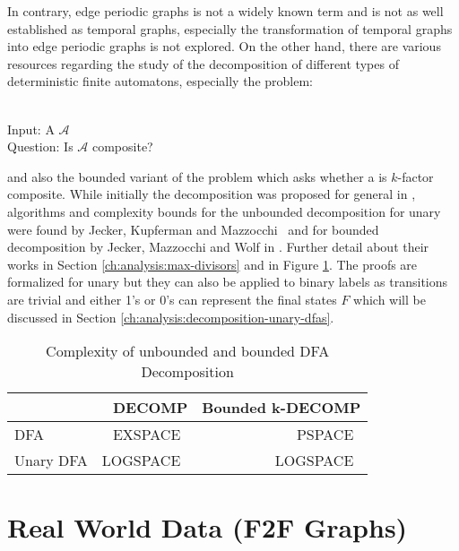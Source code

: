 In contrary, edge periodic graphs is not a widely known term and is not as well established as temporal graphs, especially the transformation of temporal graphs into edge periodic graphs is not explored.
On the other hand, there are various resources regarding the study of the decomposition of different types of deterministic finite automatons, especially the problem:
\begin{defn}{\ \\}
	Input: A \DFA $\mathcal{A}$\\
	Question: Is $\mathcal{A}$ composite?
\end{defn}
and also the bounded variant of the problem which asks whether a \DFA is $k$-factor composite. While initially the decomposition was proposed for general \DFAs in \cite{prime-languages}, algorithms and complexity bounds for the unbounded decomposition for unary \DFAs were found by Jecker, Kupferman and Mazzocchi~\cite{unara-prime-languages} and for bounded decomposition by Jecker, Mazzocchi and Wolf in \cite{DBLP:journals/corr/abs-2107-04683}.
Further detail about their works in Section \ref{ch:analysis:max-divisors} and in Figure \ref{tab:dfa-decomp-complexity}.
The proofs are formalized for unary \DFAs but they can also be applied to binary labels as transitions are trivial and either 1's or 0's can represent the final states $F$ which will be discussed in Section \ref{ch:analysis:decomposition-unary-dfas}.
\begin{table}[h]
	\centering
	\begin{tabular}{l|rr}
		&  DECOMP & Bounded k-DECOMP  \\
		\hline
		DFA & EXSPACE~\cite{prime-languages} & PSPACE~\cite{DBLP:journals/corr/abs-2107-04683}  \\
		Unary DFA & LOGSPACE~\cite{unara-prime-languages} &  LOGSPACE~\cite{DBLP:journals/corr/abs-2107-04683}
	\end{tabular}
	\caption{Complexity of unbounded and bounded DFA Decomposition}
	\label{tab:dfa-decomp-complexity}
\end{table}


\section{Real World Data (F2F Graphs)}
\label{ch:prelimiaries:real-world-data}

